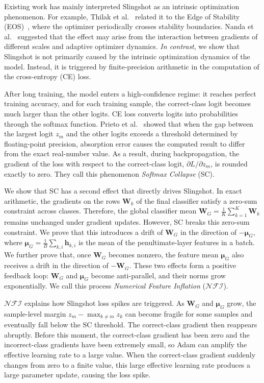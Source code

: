 \documentclass{article}
\theoremstyle{plain}
\theoremstyle{definition}
\theoremstyle{remark}
\begin{document}
Existing work has mainly interpreted Slingshot as an intrinsic optimization phenomenon. 
For example, Thilak et al.~\cite{thilak2022} related it to the Edge of Stability (EOS)~\cite{cohen2021}, 
where the optimizer periodically crosses stability boundaries. 
Nanda et al.~\cite{nanda2023} suggested that the effect may arise from the interaction between gradients of 
different scales and adaptive optimizer dynamics. \emph{In contrast}, 
we show that Slingshot is not primarily caused by the intrinsic optimization dynamics of the model. 
Instead, it is triggered by finite-precision arithmetic in the computation of the cross-entropy (CE) loss.

After long training, the model enters a high-confidence regime: 
it reaches perfect training accuracy, and for each training sample, 
the correct-class logit becomes much larger than the other logits. 
CE loss converts logits into probabilities through the softmax function. 
Prieto et al.~\cite{prieto2025} showed that when the gap between the largest logit $z_m$ and 
the other logits exceeds a threshold determined by floating-point precision, 
absorption error causes the computed result to differ from the exact real-number value. 
As a result, during backpropagation, the gradient of the loss with respect to the correct-class logit, 
$\partial L / \partial z_m$, is rounded exactly to zero. They call this phenomenon \emph{Softmax Collapse} (SC).

We show that SC has a second effect that directly drives Slingshot. 
In exact arithmetic, the gradients on the rows $\bm{W}_k$ of the final classifier satisfy 
a zero-sum constraint across classes. Therefore, the global classifier mean
$\bm{W}_G = \frac{1}{K}\sum_{k=1}^{K} \bm{W}_k$
remains unchanged under gradient updates. However, SC breaks this zero-sum constraint. 
We prove that this introduces a drift of $\bm{W}_G$ in the direction of $-\bm{\mu}_G$, where
$\bm{\mu}_G = \frac{1}{B}\sum_{k,i} \bm{h}_{k,i}$
is the mean of the penultimate-layer features in a batch. We further prove that, once $\bm{W}_G$ becomes nonzero, 
the feature mean $\bm{\mu}_G$ also receives a drift in the direction of $-\bm{W}_G$. 
These two effects form a positive feedback loop: $\bm{W}_G$ and $\bm{\mu}_G$ become anti-parallel, 
and their norms grow exponentially. We call this process \emph{Numerical Feature Inflation} ($\mathcal{NFI}$).

$\mathcal{NFI}$ explains how Slingshot loss spikes are triggered. As $\bm{W}_G$ and $\bm{\mu}_G$ grow, 
the sample-level margin $z_m - \max_{k \neq m} z_k$ can become fragile for some samples and 
eventually fall below the SC threshold. The correct-class gradient then reappears abruptly. 
Before this moment, the correct-class gradient has been zero and the incorrect-class gradients have been 
extremely small, so Adam can amplify the effective learning rate to a large value. When the correct-class gradient 
suddenly changes from zero to a finite value, this large effective learning rate produces a large parameter update, 
causing the loss spike.
\end{document}
